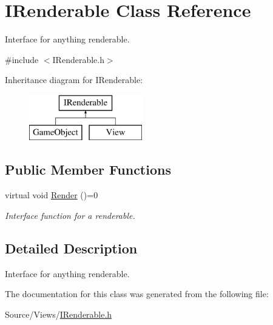 \hypertarget{class_i_renderable}{}\section{I\+Renderable Class Reference}
\label{class_i_renderable}


Interface for anything renderable.  




{\ttfamily \#include $<$I\+Renderable.\+h$>$}

Inheritance diagram for I\+Renderable\+:\begin{figure}[H]
\begin{center}
\leavevmode
\includegraphics[height=2.000000cm]{class_i_renderable}
\end{center}
\end{figure}
\subsection*{Public Member Functions}
\begin{DoxyCompactItemize}
\item 
\mbox{\label{class_i_renderable_af51ff75319f20a9bdefd76abe8060986}} 
virtual void \mbox{\hyperlink{class_i_renderable_af51ff75319f20a9bdefd76abe8060986}{Render}} ()=0
\begin{DoxyCompactList}\small\item\em Interface function for a renderable. \end{DoxyCompactList}\end{DoxyCompactItemize}


\subsection{Detailed Description}
Interface for anything renderable. 

The documentation for this class was generated from the following file\+:\begin{DoxyCompactItemize}
\item 
Source/\+Views/\mbox{\hyperlink{_i_renderable_8h}{I\+Renderable.\+h}}\end{DoxyCompactItemize}
